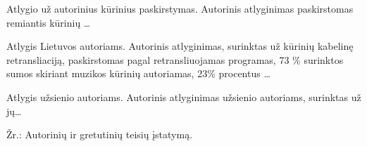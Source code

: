 Atlygio už autorinius kūrinius paskirstymas. Autorinis atlyginimas
paskirstomas remiantis kūrinių …

Atlygis Lietuvos autoriams. Autorinis atlyginimas, surinktas už kūrinių
kabelinę retransliaciją, paskirstomas pagal retransliuojamas programas,
73 \% surinktos sumos skiriant muzikos kūrinių autoriamas, 23\% procentus
…

Atlygis užsienio autoriams. Autorinis atlyginimas užsienio autoriams,
surinktas už jų…

Žr.: Autorinių ir gretutinių teisių įstatymą.

